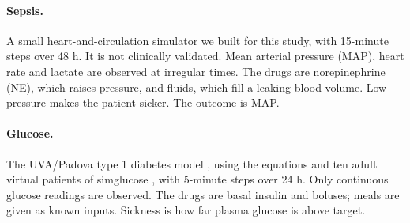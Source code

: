 \documentclass[letterpaper]{article}
\begin{document}
\paragraph{Sepsis.} A small heart-and-circulation simulator we built for this study, with 15-minute steps over 48 h. It is not clinically validated. Mean arterial pressure (MAP), heart rate and lactate are observed at irregular times. The drugs are norepinephrine (NE), which raises pressure, and fluids, which fill a leaking blood volume. Low pressure makes the patient sicker. The outcome is MAP.

\paragraph{Glucose.} The UVA/Padova type 1 diabetes model \citep{man2014uvapadova}, using the equations and ten adult virtual patients of simglucose \citep{xie2018simglucose}, with 5-minute steps over 24 h. Only continuous glucose readings are observed. The drugs are basal insulin and boluses; meals are given as known inputs. Sickness is how far plasma glucose is above target.
\end{document}
